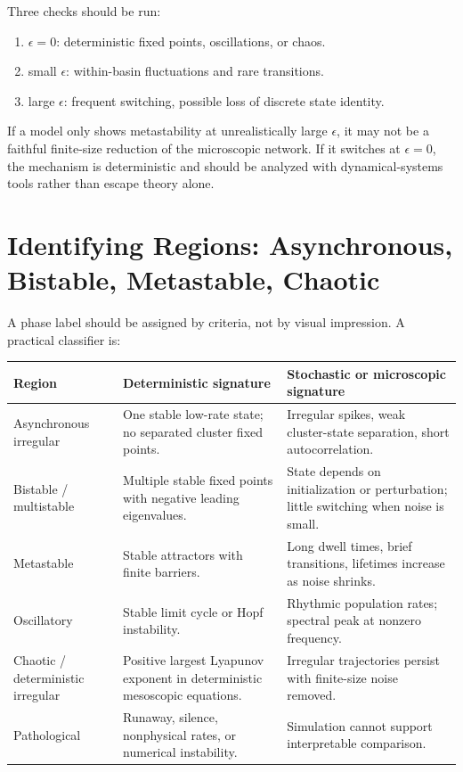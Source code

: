 Three checks should be run:
%
\begin{enumerate}[leftmargin=*]
  \item $\epsilon=0$: deterministic fixed points, oscillations, or chaos.
  \item small $\epsilon$: within-basin fluctuations and rare transitions.
  \item large $\epsilon$: frequent switching, possible loss of discrete state identity.
\end{enumerate}

If a model only shows metastability at unrealistically large $\epsilon$, it may not be a faithful finite-size reduction of the microscopic network. If it switches at $\epsilon=0$, the mechanism is deterministic and should be analyzed with dynamical-systems tools rather than escape theory alone.

\section{Identifying Regions: Asynchronous, Bistable, Metastable, Chaotic}
\label{sec:identifying-regions-phase-diagrams}

A phase label should be assigned by criteria, not by visual impression. A practical classifier is:
%
\begin{longtable}{@{}p{}p{}p{}@{}}
\toprule
\textbf{Region} & \textbf{Deterministic signature} & \textbf{Stochastic or microscopic signature} \\
\midrule
Asynchronous irregular & One stable low-rate state; no separated cluster fixed points. & Irregular spikes, weak cluster-state separation, short autocorrelation. \\
Bistable / multistable & Multiple stable fixed points with negative leading eigenvalues. & State depends on initialization or perturbation; little switching when noise is small. \\
Metastable & Stable attractors with finite barriers. & Long dwell times, brief transitions, lifetimes increase as noise shrinks. \\
Oscillatory & Stable limit cycle or Hopf instability. & Rhythmic population rates; spectral peak at nonzero frequency. \\
Chaotic / deterministic irregular & Positive largest Lyapunov exponent in deterministic mesoscopic equations. & Irregular trajectories persist with finite-size noise removed. \\
Pathological & Runaway, silence, nonphysical rates, or numerical instability. & Simulation cannot support interpretable comparison. \\
\bottomrule
\end{longtable}

